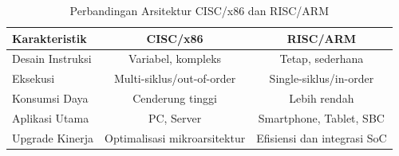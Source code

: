 \begin{table}[ht]
\centering
\begin{tabular}{|l|c|c|}
\hline
\textbf{Karakteristik} & \textbf{CISC/x86} & \textbf{RISC/ARM} \\
\hline
Desain Instruksi & Variabel, kompleks & Tetap, sederhana \\
Eksekusi & Multi-siklus/out-of-order & Single-siklus/in-order \\
Konsumsi Daya & Cenderung tinggi & Lebih rendah \\
Aplikasi Utama & PC, Server & Smartphone, Tablet, SBC \\
Upgrade Kinerja & Optimalisasi mikroarsitektur & Efisiensi dan integrasi SoC \\
\hline
\end{tabular}
\caption{Perbandingan Arsitektur CISC/x86 dan RISC/ARM}
\label{tab:risc-cisc}
\end{table}
